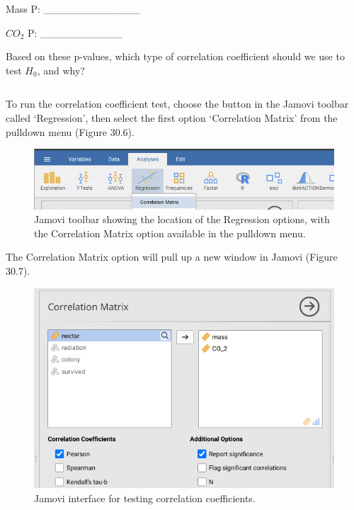 \documentclass[
]{scrbook}
\begin{document}
Mass P: \_\_\_\_\_\_\_\_\_\_\_\_\_

\(CO_{2}\) P: \_\_\_\_\_\_\_\_\_\_\_

Based on these p-values, which type of correlation coefficient should we use to test \(H_{0}\), and why?

\begin{verbatim}

\end{verbatim}

To run the correlation coefficient test, choose the button in the Jamovi toolbar called `Regression', then select the first option `Correlation Matrix' from the pulldown menu (Figure 30.6).

\begin{figure}
\includegraphics[width=1\linewidth]{img/jamovi_correlation_toolbar} \caption{Jamovi toolbar showing the location of the Regression options, with the Correlation Matrix option available in the pulldown menu.}\label{fig:unnamed-chunk-155}
\end{figure}

The Correlation Matrix option will pull up a new window in Jamovi (Figure 30.7).

\begin{figure}
\includegraphics[width=1\linewidth]{img/jamovi_correlation_interface} \caption{Jamovi interface for testing correlation coefficients.}\label{fig:unnamed-chunk-156}
\end{figure}
\end{document}
